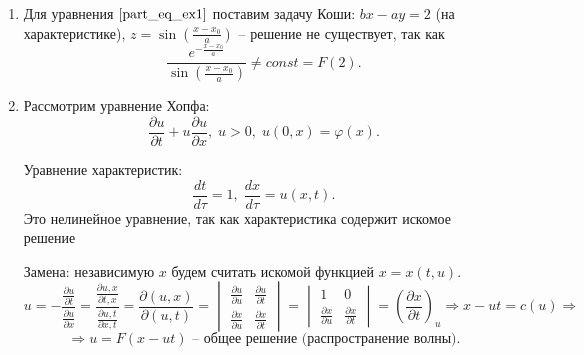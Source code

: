 \begin{enumerate}
    \item

    Для уравнения $\eqref{part_eq_ex1}$ поставим задачу Коши: $bx - ay = 2$ (на характеристике), $z = \sin (\frac{x - x_0}{a})$ -- решение не существует, так как 
    \begin{equation*}
        \frac{e^{-\frac{x - x_0}{a}}}{\sin \left( \frac{x - x_0}{a} \right)} \neq const = F(2).
    \end{equation*}

    \item Рассмотрим уравнение Хопфа:
    \begin{equation*}
        \frac{\partial u}{\partial t} + u \frac{\partial u}{\partial x}, \; u > 0, \; u(0, x) = \varphi(x).
    \end{equation*}

    Уравнение характеристик:
    \begin{equation*}
    	\frac{dt}{d \tau} = 1, \; \frac{dx}{d \tau} = u(x, t).
    \end{equation*}
    \noindent  Это нелинейное уравнение, так как характеристика содержит искомое решение
    
    Замена: независимую $x$ будем считать искомой функцией $x = x(t, u)$.
    \begin{equation*}
    	u = - \frac{\frac{\partial u}{\partial t}}{\frac{\partial u}{\partial x}}  = \frac{\frac{\partial u, x}{\partial t, x}}{\frac{\partial u, t}{\partial x, t}} = \frac{\partial (u, x)}{\partial (u, t)} = 
    	\begin{vmatrix}
    		\frac{\partial u}{\partial u} & \frac{\partial u}{\partial t} \\
    		\frac{\partial x}{\partial u} & \frac{\partial x}{\partial t}
    	\end{vmatrix} = 
    	\begin{vmatrix}
    		1 & 0 \\
    		\frac{\partial x}{\partial u} & \frac{\partial x}{\partial t}
    	\end{vmatrix} = \left( \frac{\partial x}{\partial t} \right)_{u} \Rightarrow x - ut = c(u) \Rightarrow 
    \end{equation*}
    \begin{equation*}
    	\Rightarrow u = F(x - ut) \text{ -- общее решение (распространение волны)}.
    \end{equation*}
    
\end{enumerate}
